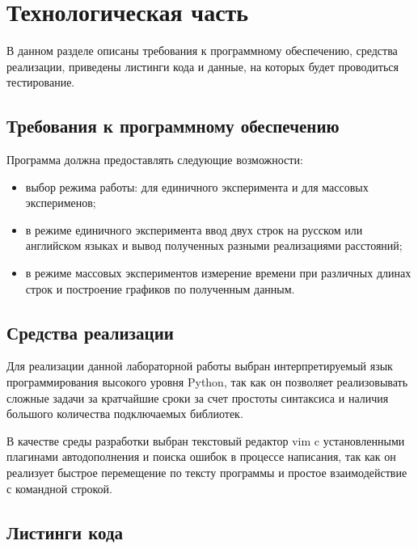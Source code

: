 \chapter{Технологическая часть}

В данном разделе описаны требования к программному обеспечению, средства
реализации, приведены листинги кода и данные, на которых будет проводиться
тестирование.

\section{Требования к программному обеспечению}

Программа должна предоставлять следующие возможности:
\begin{itemize}[left=\parindent]
    \item выбор режима работы: для единичного эксперимента и для массовых
          эксперименов;
    \item в режиме единичного эксперимента ввод двух строк на русском или
          английском языках и вывод полученных разными реализациями расстояний;
    \item в режиме массовых экспериментов измерение времени при различных
          длинах строк и построение графиков по полученным данным.
\end{itemize}

\section{Средства реализации}


Для реализации данной лабораторной работы выбран интерпретируемый язык
программирования высокого уровня Python, так как он позволяет реализовывать
сложные задачи за кратчайшие сроки за счет простоты синтаксиса и наличия
большого количества подключаемых библиотек. 

В качестве среды разработки выбран текстовый редактор vim c установленными
плагинами автодополнения и поиска ошибок в процессе написания, так как он
реализует быстрое перемещение по тексту программы и простое взаимодействие с
командной строкой.

\section{Листинги кода}

